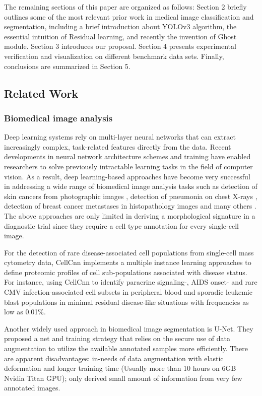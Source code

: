 {The remaining sections of this paper are organized as follows: Section 2 briefly outlines some of the most relevant prior work in medical image classification and segmentation, including a brief introduction about YOLOv3 \cite{33} algorithm, the essential intuition of Residual learning, and recently the invention of Ghost module.
Section 3 introduces our proposal. Section 4 presents experimental verification and visualization on different benchmark data sets. Finally, conclusions are summarized in Section 5.

\subsection{Related Work}
\subsubsection{Biomedical image analysis}

Deep learning systems rely on multi-layer neural networks that can extract increasingly complex, task-related features directly from the data. Recent developments in neural network architecture schemes and training have enabled researchers to solve previously intractable learning tasks in the field of computer vision. As a result, deep learning-based approaches have become very successful in addressing a wide range of biomedical image analysis tasks such as detection of skin cancers from photographic images \cite{10}, detection of pneumonia on chest X-rays \cite{13}, detection of breast cancer metastases in histopathology images and many others \cite{2}. 
The above approaches are only limited in deriving a morphological signature in a diagnostic trial since they require a cell type annotation for every single-cell image.


For the detection of rare disease-associated cell populations from single-cell mass cytometry data, CellCnn \cite{3} implements a multiple instance learning approaches to define proteomic profiles of cell sub-populations associated with disease status. For instance, using CellCnn to identify paracrine signaling-, AIDS onset- and rare CMV infection-associated cell subsets in peripheral blood and sporadic leukemic blast populations in minimal residual disease-like situations with frequencies as low as 0.01\%\cite{3}.

Another widely used approach in biomedical image segmentation is U-Net\cite{14}. They proposed a net and training strategy that relies on the secure use of data augmentation to utilize the available annotated samples more efficiently\cite{14}.
There are apparent disadvantages: in-needs of data augmentation with elastic deformation and longer training time (Usually more than 10 hours on 6GB Nvidia Titan GPU); only derived small amount of information from very few annotated images\cite{14}.

}
